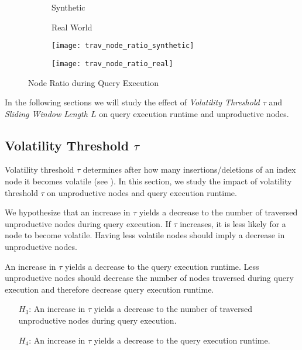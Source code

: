 \documentclass[abstracton,12pt]{scrartcl}
\theoremstyle{definition}
\begin{document}
\begin{figure}[h]
 \centering
  \begin{subfigure}{0.49\linewidth}
    \centering
    Synthetic
  \end{subfigure}
  \begin{subfigure}{0.49\linewidth}
    \centering
    Real World
  \end{subfigure}
  \begin{subfigure}{0.49\linewidth}
    \centering
    \texttt{[image: trav\_node\_ratio\_synthetic]}
    \caption{}
    \label{fig:trav_node_ratio_synthetic}
  \end{subfigure}
  \begin{subfigure}{0.49\linewidth}
    \centering
    \texttt{[image: trav\_node\_ratio\_real]}
    \caption{}
    \label{fig:trav_node_ratio_real}
  \end{subfigure}
 \caption{Node Ratio during Query Execution}
\end{figure}

In the following sections we will study the effect of \textit{Volatility
  Threshold $\tau$} and \textit{Sliding Window Length $L$} on query execution runtime and
unproductive nodes.

\subsection{Volatility Threshold $\tau$}

Volatility threshold $\tau$ determines after how many insertions/deletions of an index node
it becomes volatile (see ). In this section, we study the impact of
volatility threshold $\tau$ on unproductive nodes and query execution runtime.

We hypothesize that an increase in $\tau$ yields a decrease to the number of traversed unproductive
nodes during query execution. If $\tau$ increases, it is less likely for a node to become
volatile. Having less volatile nodes should imply a decrease in unproductive nodes.

An increase in $\tau$ yields a decrease to the query execution runtime. Less
unproductive nodes should decrease the number of nodes traversed
during query execution and therefore decrease query execution runtime.

\begin{shaded}
  \begin{itemize}
  \item[$H_3$:] An increase in $\tau$ yields a decrease to the number of
    traversed unproductive nodes during query execution.
  \item[$H_4$:] An increase in $\tau$ yields a decrease to the query execution runtime. 
    \end{itemize}
\end{shaded}
\end{document}
